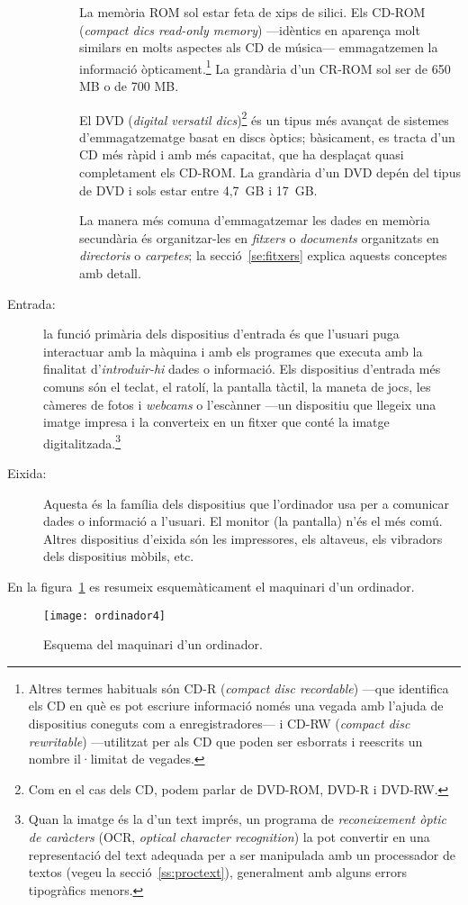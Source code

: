 \begin{description}
\begin{description}
    La memòria ROM sol estar feta de xips de silici. Els CD-ROM
    (\emph{compact dics read-only memory}) ---idèntics en aparença
    molt similars en molts aspectes als CD de música--- emmagatzemen
    la informació òpticament.\footnote{Altres termes habituals són
      CD-R (\emph{compact disc recordable}) ---que identifica els CD
      en què es pot escriure informació només una vegada amb l'ajuda
      de dispositius coneguts com a enregistradores--- i CD-RW
      (\emph{compact disc rewritable}) ---utilitzat per als CD que
      poden ser esborrats i reescrits un nombre il·limitat de
      vegades.} La grandària d'un CR-ROM sol ser de 650 MB o de 700
    MB.

    El DVD (\emph{digital versatil dics})\footnote{Com en el cas dels
      CD, podem parlar de DVD-ROM, DVD-R i DVD-RW.} és un tipus més
    avançat de sistemes d'emmagatzematge basat en discs òptics;
    bàsicament, es tracta d'un CD més ràpid i amb més capacitat, que
    ha desplaçat quasi completament els CD-ROM. La grandària d'un DVD
    depén del tipus de DVD i sols estar entre 4,7~GB i 17~GB.
    
    La manera més comuna d'emmagatzemar les dades en memòria
    secundària és organitzar-les en {\em fitxers} o \emph{documents}
    organitzats en \emph{directoris} o \emph{carpetes}; la
    secció~\ref{se:fitxers} explica aquests conceptes amb
    detall.\label{pg:menciofitxer}
  \end{description}

\item[Entrada:] la funció primària dels dispositius d'entrada és que
  l'usuari puga interactuar amb la màquina i amb els programes que
  executa amb la finalitat d'\emph{introduir-hi} dades o
  informació. Els dispositius d'entrada més comuns són el teclat, el
  ratolí, la pantalla tàctil, la maneta de jocs, les càmeres de fotos
  i \emph{webcams} o l'escànner ---un dispositiu que llegeix una
  imatge impresa i la converteix en un fitxer  que conté la imatge
  digitalitzada.\footnote{Quan la imatge és la d'un text imprés, un
    programa de \emph{reconeixement òptic de caràcters} (OCR,
    \emph{optical character recognition}) la pot convertir en una
    representació del text adequada per a ser manipulada amb un
    processador de textos (vegeu la secció~\ref{ss:proctext}),
    generalment amb alguns errors tipogràfics menors.}

\item[Eixida:] Aquesta és la família dels dispositius que l'ordinador
  usa per a comunicar dades o informació a l'usuari.  El monitor (la
  pantalla) n'és el més comú. Altres dispositius d'eixida són les
  impressores, els altaveus, els vibradors dels dispositius mòbils,
  etc.

\end{description}
En la figura~\ref{fg:ordinador} es resumeix esquemàticament el
maquinari d'un ordinador.
\begin{figure}
  \centering
  \texttt{[image: ordinador4]}
  \caption{Esquema del maquinari d'un ordinador.}
  \label{fg:ordinador}
\end{figure}


